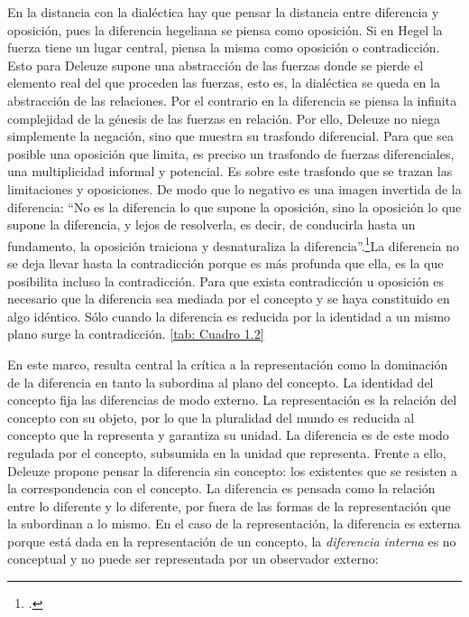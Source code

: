 En la distancia con la dialéctica hay que pensar la distancia entre diferencia y oposición, pues la diferencia hegeliana se piensa como oposición. Si en Hegel la fuerza tiene un lugar central, piensa la misma como oposición o contradicción. Esto para Deleuze supone una abstracción de las fuerzas donde se pierde el elemento real del que proceden las fuerzas, esto es, la dialéctica se queda en la abstracción de las relaciones. Por el contrario en la diferencia se piensa la infinita complejidad de la génesis de las fuerzas en relación. Por ello, Deleuze no niega simplemente la negación, sino que muestra su trasfondo diferencial. Para que sea posible una oposición que limita, es preciso un trasfondo de fuerzas diferenciales, una multiplicidad informal y potencial. Es sobre este trasfondo que se trazan las limitaciones y oposiciones. De modo que lo negativo es una imagen invertida de la diferencia: \enquote{No es la diferencia lo que supone la oposición, sino la oposición lo que supone la diferencia, y lejos de resolverla, es decir, de conducirla hasta un fundamento, la oposición traiciona y desnaturaliza la diferencia}.\footcite[94]{@6961-DELEUZE2002}La diferencia no se deja llevar hasta la contradicción porque es más profunda que ella, es la que posibilita incluso la contradicción. Para que exista contradicción u oposición es necesario que la diferencia sea mediada por el concepto y se haya constituido en algo idéntico. Sólo cuando la diferencia es reducida por la identidad a un mismo plano surge la contradicción. \ref{tab: Cuadro 1.2}

En este marco, resulta central la crítica a la representación como la dominación de la diferencia en tanto la subordina al plano del concepto. La identidad del concepto fija las diferencias de modo externo. La representación es la relación del concepto con su objeto, por lo que la pluralidad del mundo es reducida al concepto que la representa y garantiza su unidad. La diferencia es de este modo regulada por el concepto, subsumida en la unidad que representa. Frente a ello, Deleuze propone pensar la diferencia sin concepto: los existentes que se resisten a la correspondencia con el concepto. La diferencia es pensada como la relación entre lo diferente y lo diferente, por fuera de las formas de la representación que la subordinan a lo mismo. En el caso de la representación, la diferencia es externa porque está dada en la representación de un concepto, la \emph{diferencia interna} es no conceptual y no puede ser representada por un observador externo:

